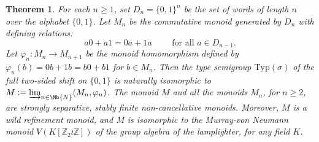 \documentclass[11pt]{amsart}
\def\N{\mathbb{N}}
\theoremstyle{plain}            %
\newtheorem{theorem}{Theorem}[section]
\theoremstyle{definition}       %
\theoremstyle{definition}       %
\theoremstyle{remark}
\newcommand{\Typ}{\mathrm{Typ}}
\def\Z{\mathbb{Z}}
\def\N{\mathbb{N}}
\def\N{\Mb{N}}
\def\N{\Mb{N}}
\begin{document}
\begin{theorem}
\label{thm:type-semigroup-lamplighter}
For each $n\ge 1$, set $D_n= \{0,1\}^n$ be the set of words of length $n$ over the alphabet $\{0,1\}$. Let $M_n$ be the commutative monoid generated by $D_n$ with defining relations:
$$a0+a1 = 0a+1a \qquad \text{ for all } a\in D_{n-1}.$$
Let $\varphi_n \colon M_n\to M_{n+1}$ be the monoid homomorphism defined by $\varphi_n (b) = 0b+1b= b0+b1$ for $b\in M_n$. 
Then the type semigroup $\Typ (\sigma)$ of the full two-sided shift on $\{0,1\}$ is naturally isomorphic to $M:= \varinjlim_{n\in \N} (M_n,\varphi_n)$. 
The monoid $M$ and all the monoids $M_n$, for $n\ge 2$, are strongly separative, stably finite non-cancellative monoids. Moreover,  $M$ is a wild refinement monoid, and $M$ is isomorphic to the Murray-von Neumann monoid $ V(K[\Z_2 \wr \Z])$ of the group algebra of the lamplighter, for any field $K$.
\end{theorem}
\end{document}
